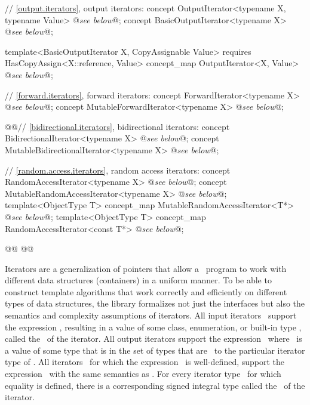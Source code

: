 \documentclass[american,twoside]{book}
\begin{document}
\begin{paras}
\begin{codeblock}
{  // \ref{output.iterators}, output iterators:
  concept OutputIterator<typename X, typename Value> @\textit{see below}@;
  concept BasicOutputIterator<typename X> @\textit{see below}@;

  template<BasicOutputIterator X, CopyAssignable Value>
    requires HasCopyAssign<X::reference, Value>
    concept_map OutputIterator<X, Value> @\textit{see below}@;

  // \ref{forward.iterators}, forward iterators:
  concept ForwardIterator<typename X> @\textit{see below}@;
  concept MutableForwardIterator<typename X> @\textit{see below}@;

  @\textcolor{addclr}{}@// \ref{bidirectional.iterators}, bidirectional iterators:
  concept BidirectionalIterator<typename X> @\textit{see below}@;
  concept MutableBidirectionalIterator<typename X> @\textit{see below}@;

  // \ref{random.access.iterators}, random access iterators:
  concept RandomAccessIterator<typename X> @\textit{see below}@;
  concept MutableRandomAccessIterator<typename X> @\textit{see below}@;
  template<ObjectType T> concept_map MutableRandomAccessIterator<T*> @\textit{see below}@;
  template<ObjectType T> concept_map RandomAccessIterator<const T*> @\textit{see below}@;

  @@
  @@
}
\end{codeblock}
\color{black}

\pnum
{}%
Iterators are a generalization of pointers that allow a \Cpp\ program to work with different data structures
(containers) in a uniform manner.
To be able to construct template algorithms that work correctly and
efficiently on different types of data structures, the library formalizes not just the interfaces but also the
semantics and complexity assumptions of iterators.
All input iterators
\
support the expression
,
resulting in a value of some class, enumeration, or built-in type
\tcode{T},
called the
\ 
of the iterator.
All output iterators support the expression
\
where
\tcode{o}\
is a value of some type that is in the set of types that are
\
to the particular iterator type of
.
All iterators
\tcode{i}\
for which the expression
\
is well-defined, support the expression
\tcode{i->m}\
with the same semantics as
\tcode{(*i).m}.
For every iterator type
\tcode{X}\
for which
equality is defined, there is a corresponding signed integral type called the
\ 
of the iterator.


\end{paras}
\end{document}
